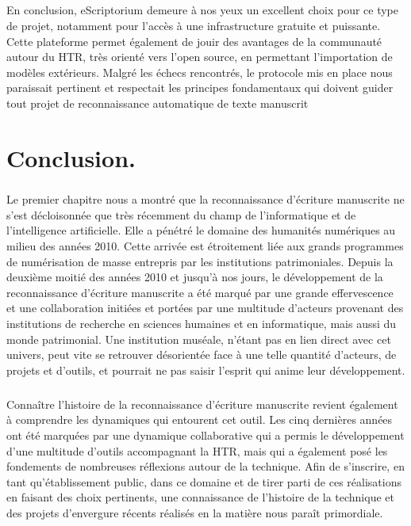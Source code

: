 \documentclass[a4paper,12pt,twoside]{book}
\begin{document}
\paragraph{}
En conclusion, eScriptorium demeure à nos yeux un excellent choix pour ce type de projet, notamment pour l'accès à une infrastructure gratuite et puissante. Cette plateforme permet également de jouir des avantages de la communauté autour du HTR, très orienté vers l’open source, en permettant l’importation de modèles extérieurs. Malgré les échecs rencontrés, le protocole mis en place nous paraissait pertinent et respectait les principes fondamentaux qui doivent guider tout projet de reconnaissance automatique de texte manuscrit
		
		
	


 


	
	

	\newpage{\pagestyle{empty}\cleardoublepage}
\chapter*{Conclusion.}
\paragraph{}	
Le premier chapitre nous a montré que la reconnaissance d’écriture manuscrite ne s’est décloisonnée que très récemment du champ de l’informatique et de l’intelligence artificielle. Elle a pénétré le domaine des humanités numériques au milieu des années 2010. Cette arrivée est étroitement liée aux grands programmes de numérisation de masse entrepris par les institutions patrimoniales. Depuis la deuxième moitié des années 2010 et jusqu’à nos jours, le développement de la reconnaissance d’écriture manuscrite a été marqué par une grande effervescence et une collaboration initiées et portées par une multitude d’acteurs provenant des institutions de recherche en sciences humaines et en informatique, mais aussi du monde patrimonial. Une institution muséale, n’étant pas en lien direct avec cet univers, peut vite se retrouver désorientée face à une telle quantité d’acteurs, de projets et d’outils, et pourrait ne pas saisir l’esprit qui anime leur développement.

\paragraph{}
Connaître l’histoire de la reconnaissance d’écriture manuscrite revient également à comprendre les dynamiques qui entourent cet outil. Les cinq dernières années ont été marquées par une dynamique collaborative qui a permis le développement d’une multitude d’outils accompagnant la HTR, mais qui a également posé les fondements de nombreuses réflexions autour de la technique. Afin de s’inscrire, en tant qu’établissement public, dans ce domaine et de tirer parti de ces réalisations en faisant des choix pertinents, une connaissance de l’histoire de la technique et des projets d’envergure récents réalisés en la matière nous paraît primordiale.
\end{document}

